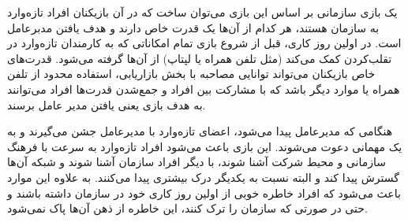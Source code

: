 یک بازی سازمانی بر اساس این بازی می‌توان ساخت که در آن بازیکنان افراد تازه‌وارد به سازمان هستند، هر کدام از آن‌ها یک قدرت خاص دارند و هدف یافتن مدبرعامل است. در اولین روز کاری، قبل از شروع بازی تمام امکاناتی که به کارمندان تازه‌وارد در تقلب‌کردن کمک می‌کند (مثل تلفن همراه یا لپتاپ) از آن‌ها گرفته می‌شود. قدرت‌های خاص بازیکنان می‌تواند توانایی مصاحبه با بخش بازاریابی، استفاده محدود از تلفن همراه یا موارد دیگر باشد که با مشارکت بین افراد و جمع‌شدن قدرت‌ها افراد می‌توانند به هدف بازی یعنی یافتن مدیر عامل برسند.

هنگامی که مدیرعامل پیدا می‌شود، اعضای تازه‌وارد با مدیرعامل جشن می‌گیرند و به یک مهمانی دعوت می‌شوند. 
این بازی باعث می‌شود افراد تازه‌وارد به سرعت با فرهنگ سازمانی و محیط شرکت آشنا شوند، با دیگر افراد سازمان آشنا شوند و شبکه آن‌ها گسترش پیدا کند و البته نسبت به یکدیگر درک بیشتری پیدا می‌کنند. به علاوه این موارد باعث می‌شود که افراد خاطره خوبی از اولین روز کاری خود در سازمان داشته باشند و حتی در صورتی که سازمان را ترک کنند، این خاطره از ذهن آن‌ها پاک نمی‌شود.
